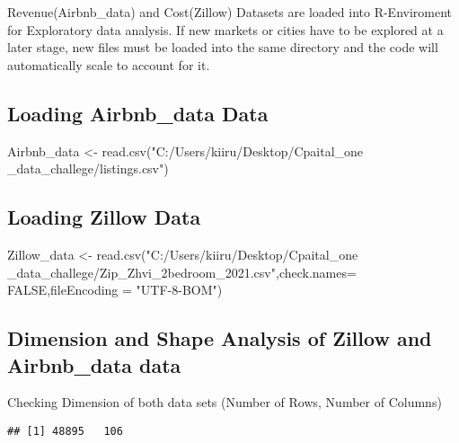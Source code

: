 \documentclass[
]{article}
\newenvironment{Shaded}{\begin{snugshade}}{\end{snugshade}}
\newcommand{\AttributeTok}[1]{\textcolor[rgb]{0.77,0.63,0.00}{#1}}
\newcommand{\ConstantTok}[1]{\textcolor[rgb]{0.00,0.00,0.00}{#1}}
\newcommand{\FunctionTok}[1]{\textcolor[rgb]{0.00,0.00,0.00}{#1}}
\newcommand{\NormalTok}[1]{#1}
\newcommand{\OtherTok}[1]{\textcolor[rgb]{0.56,0.35,0.01}{#1}}
\newcommand{\StringTok}[1]{\textcolor[rgb]{0.31,0.60,0.02}{#1}}
\begin{document}
Revenue(Airbnb\_data) and Cost(Zillow) Datasets are loaded into
R-Enviroment for Exploratory data analysis. If new markets or cities
have to be explored at a later stage, new files must be loaded into the
same directory and the code will automatically scale to account for it.

\hypertarget{loading-airbnb_data-data}{%
\subsection{Loading Airbnb\_data Data}\label{loading-airbnb_data-data}}

\begin{Shaded}
\begin{Highlighting}[]
\NormalTok{Airbnb\_data }\OtherTok{\textless{}{-}} \FunctionTok{read.csv}\NormalTok{(}\StringTok{"C:/Users/kiiru/Desktop/Cpaital\_one \_data\_challege/listings.csv"}\NormalTok{)}
\end{Highlighting}
\end{Shaded}

\hypertarget{loading-zillow-data}{%
\subsection{Loading Zillow Data}\label{loading-zillow-data}}

\begin{Shaded}
\begin{Highlighting}[]
\NormalTok{Zillow\_data }\OtherTok{\textless{}{-}} \FunctionTok{read.csv}\NormalTok{(}\StringTok{"C:/Users/kiiru/Desktop/Cpaital\_one \_data\_challege/Zip\_Zhvi\_2bedroom\_2021.csv"}\NormalTok{,}\AttributeTok{check.names=} \ConstantTok{FALSE}\NormalTok{,}\AttributeTok{fileEncoding =} \StringTok{"UTF{-}8{-}BOM"}\NormalTok{)}
\end{Highlighting}
\end{Shaded}

\hypertarget{dimension-and-shape-analysis-of-zillow-and-airbnb_data-data}{%
\subsection{Dimension and Shape Analysis of Zillow and Airbnb\_data
data}\label{dimension-and-shape-analysis-of-zillow-and-airbnb_data-data}}

Checking Dimension of both data sets (Number of Rows, Number of Columns)

\begin{verbatim}
## [1] 48895   106
\end{verbatim}
\end{document}
